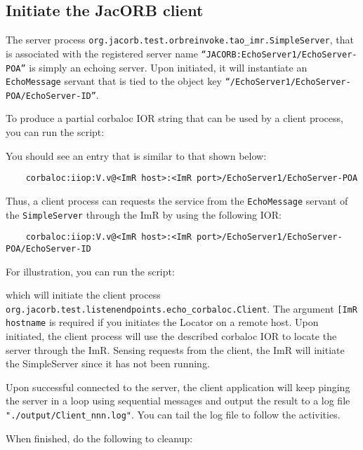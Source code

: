 \subsection{Initiate the JacORB client}

The server process {\tt org.jacorb.test.orbreinvoke.tao\_imr.SimpleServer},  that is
associated with the registered server name
{\tt “JACORB:EchoServer1/EchoServer-POA”} is simply an echoing server.
Upon initiated, it will instantiate an {\tt EchoMessage} servant that is tied to
the object key {\tt “/EchoServer1/EchoServer-POA/EchoServer-ID”}.

To produce a partial corbaloc IOR string that can be used by a client process,
you can run the script:


You should see an entry that is similar to that shown below:

\small{
\begin{verbatim}
    corbaloc:iiop:V.v@<ImR host>:<ImR port>/EchoServer1/EchoServer-POA
\end{verbatim}
}

Thus, a client process can requests the service from the {\tt EchoMessage} servant
of the {\tt SimpleServer} through the ImR by using the following IOR:

\small{
\begin{verbatim}
    corbaloc:iiop:V.v@<ImR host>:<ImR port>/EchoServer1/EchoServer-POA/EchoServer-ID
\end{verbatim}
}

For illustration, you can run the script:


which will initiate the client process {\tt org.jacorb.test.listenendpoints.echo\_corbaloc.Client}.
The argument {\tt [ImR hostname} is required if you initiates the Locator on a
remote host.  Upon initiated, the client process will use the described corbaloc
IOR to locate the server through the ImR.  Sensing requests from the client,
the ImR will initiate the SimpleServer since it has not been running.

Upon successful connected to the server, the client application will keep pinging
the server in a loop using sequential messages and output the result to a log file
{\tt"./output/Client\_nnn.log"}.  You can tail the log file to follow the activities.

When finished, do the following to cleanup:

